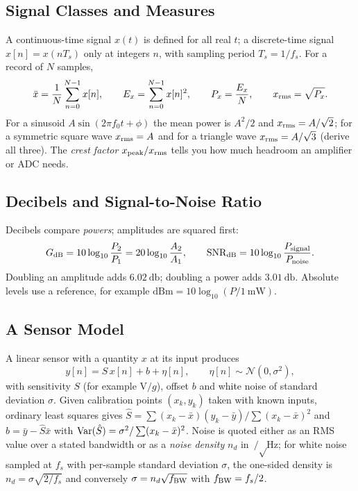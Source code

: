 \documentclass[11pt,a4paper]{article}
\begin{document}
\subsection{Signal Classes and Measures}
A continuous-time signal $x(t)$ is defined for all real $t$; a discrete-time signal $x[n]=x(nT_s)$ only at integers $n$, with sampling period $T_s=1/f_s$. For a record of $N$ samples,
\begin{equation}
  \bar{x}=\frac1N\sum_{n=0}^{N-1}x[n],\qquad
  E_x=\sum_{n=0}^{N-1}x[n]^2,\qquad
  P_x=\frac{E_x}{N},\qquad
  x_{\rm rms}=\sqrt{P_x}.
  \label{eq:measures}
\end{equation}
For a sinusoid $A\sin(2\pi f_0 t+\phi)$ the mean power is $A^2/2$ and $x_{\rm rms}=A/\sqrt2$; for a symmetric square wave $x_{\rm rms}=A$ and for a triangle wave $x_{\rm rms}=A/\sqrt3$ (derive all three). The \emph{crest factor} $x_{\rm peak}/x_{\rm rms}$ tells you how much headroom an amplifier or ADC needs.

\subsection{Decibels and Signal-to-Noise Ratio}
Decibels compare \emph{powers}; amplitudes are squared first:
\begin{equation}
  G_{\rm dB}=10\log_{10}\frac{P_2}{P_1}=20\log_{10}\frac{A_2}{A_1},\qquad
  \mathrm{SNR}_{\rm dB}=10\log_{10}\frac{P_{\rm signal}}{P_{\rm noise}}.
  \label{eq:snr}
\end{equation}
Doubling an amplitude adds $\SI{6.02}{\decibel}$; doubling a power adds $\SI{3.01}{\decibel}$. Absolute levels use a reference, for example $\mathrm{dBm}=10\log_{10}(P/\SI{1}{\milli\watt})$.

\subsection{A Sensor Model}
A linear sensor with a quantity $x$ at its input produces
\begin{equation}
  y[n]=S\,x[n]+b+\eta[n],\qquad \eta[n]\sim\mathcal N(0,\sigma^2),
  \label{eq:sensor}
\end{equation}
with sensitivity $S$ (for example $\mathrm{V}/g$), offset $b$ and white noise of standard deviation $\sigma$. Given calibration points $(x_k,y_k)$ taken with known inputs, ordinary least squares gives $\hat S=\sum(x_k-\bar x)(y_k-\bar y)/\sum(x_k-\bar x)^2$ and $\hat b=\bar y-\hat S\bar x$ with $\operatorname{Var}(\hat S)=\sigma^2/\sum(x_k-\bar x)^2$. Noise is quoted either as an RMS value over a stated bandwidth or as a \emph{noise density} $n_d$ in $\si{\per\sqrt\hertz}$; for white noise sampled at $f_s$ with per-sample standard deviation $\sigma$, the one-sided density is $n_d=\sigma\sqrt{2/f_s}$ and conversely $\sigma=n_d\sqrt{f_{\rm BW}}$ with $f_{\rm BW}=f_s/2$.
\end{document}
